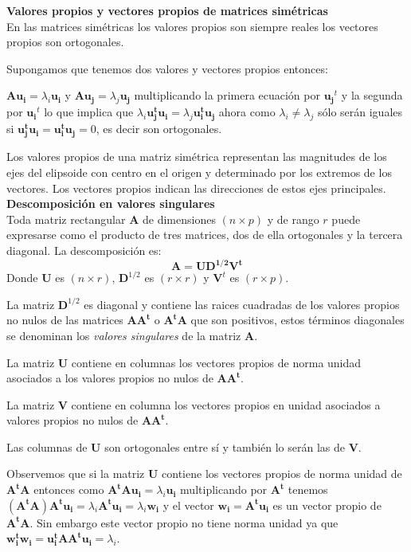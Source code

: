 \documentclass[12pt,letterpaper]{report} %
\begin{document}
\textbf{Valores propios y vectores propios de matrices simétricas} \\

En las matrices simétricas los valores propios son siempre reales los vectores propios son ortogonales.

Supongamos que tenemos dos valores y vectores propios entonces: 

$\mathbf{Au_{i}}=\lambda_{i}\mathbf{u_{i}}$ y  $\mathbf{Au_{j}}=\lambda_{j}\mathbf{u_{j}}$ multiplicando la primera ecuación por $\mathbf{u_{j}}^t$ y la segunda por $\mathbf{u_{i}}^t$ lo que implica que  $\lambda_{i}\mathbf{u_{j}^tu_{i}}=\lambda_{j}\mathbf{u_{i}^tu_{j}}$ ahora como $\lambda_{i} \ne \lambda_{j}$ sólo serán iguales si $\mathbf{u_{j}^tu_{i}}=\mathbf{u_{i}^tu_{j}}=0$, es decir son ortogonales.

Los valores propios de una matriz simétrica representan las magnitudes de los ejes del elipsoide con centro en el origen y determinado por los extremos de los vectores. Los vectores propios indican las direcciones de estos ejes principales.\\

\textbf{Descomposición en valores singulares} \\

Toda matriz rectangular $\mathbf{A}$ de dimensiones $(n\times p)$ y de rango $r$ puede expresarse como el producto de tres matrices, dos de ella ortogonales y la tercera diagonal. La descomposición es:
$$\mathbf{A}=\mathbf{UD^{1/2}V^t}$$
Donde $\mathbf{U}$ es $(n \times r)$, $\mathbf{D}^{1/2}$ es $(r \times r)$ y $\mathbf{V}^t$ es $(r \times p)$.

La matriz $\mathbf{D}^{1/2}$ es diagonal y contiene las raices cuadradas de los valores propios no nulos de las matrices $\mathbf{AA^t}$ o $\mathbf{A^tA}$ que son positivos, estos términos diagonales se denominan los \textit{valores singulares} de la matriz $\mathbf{A}$.

La matriz $\mathbf{U}$ contiene en columnas los vectores propios de norma unidad asociados a los valores propios no nulos de $\mathbf{AA^t}$.

La matriz $\mathbf{V}$ contiene en columna los vectores propios en unidad asociados a valores propios no nulos de $\mathbf{AA^t}$.

Las columnas de $\mathbf{U}$ son ortogonales entre sí y también lo serán las de $\mathbf{V}$.

Observemos que si la matriz $\mathbf{U}$ contiene los vectores propios de norma unidad de $\mathbf{A^tA}$  entonces como $\mathbf{A^tAu_{i}}=\lambda_{i}\mathbf{u_{i}}$ multiplicando por $\mathbf{A^t}$ tenemos $\mathbf{(A^tA)A^tu_{i}}=\lambda_{i}\mathbf{A^tu_{i}}=\lambda_{i}\mathbf{w_{i}}$ y el vector $\mathbf{w_{i}}=\mathbf{A^tu_{i}}$ es un vector propio de $\mathbf{A^tA}$. Sin embargo este vector propio no tiene norma unidad ya que $\mathbf{w_{i}^t w_{i}}=\mathbf{u_{i}^tAA^tu_{i}}=\lambda_{i}$.
\end{document}
